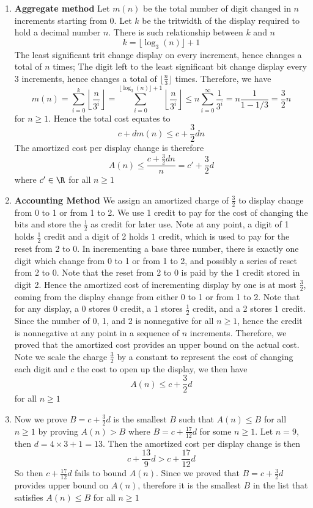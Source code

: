 \documentclass[11pt]{article}
\begin{document}
\begin{enumerate}
  \item \textbf{Aggregate method} Let $m(n)$ be the total number of digit changed in $n$ increments starting from 0. Let $k$ be the tritwidth of the display required to hold a decimal number $n$. There is such relationship between $k$ and $n$
  \[
    k = \lfloor \log_3(n) \rfloor + 1
  \]
  The least significant trit change display on every increment, hence changes a total of $n$ times; The digit left to the least significant bit change display every $3$ increments, hence changes a total of $\lfloor \frac{n}{3} \rfloor$ times. Therefore, we have
  \[
    m(n) = \sum_{i=0}^{k}\left\lfloor \frac{n}{3^i} \right\rfloor = \sum_{i=0}^{\lfloor \log_3(n) \rfloor + 1} \left\lfloor \frac{n}{3^i} \right\rfloor \leq n\sum_{i=0}^{\infty} \frac{1}{3^i} = n \frac{1}{1 - 1/3} = \frac{3}{2} n
  \]
  for $n\geq 1$. Hence the total cost equates to
  \[
    c + dm(n) \leq c + \frac{3}{2}dn
  \]
  The amortized cost per display change is therefore
  \[
    A(n) \leq \frac{c + \frac{3}{2}dn}{n} = c' + \frac{3}{2}d
  \]
  where $c' \in \R$ for all $n\geq 1$
  \item \textbf{Accounting Method} We assign an amortized charge of $\frac{3}{2}$ to display change from 0 to 1 or from 1 to 2. We use 1 credit to pay for the cost of changing the bits and store the $\frac{1}{2}$ as credit for later use. Note at any point, a digit of 1 holds $\frac{1}{2}$ credit and a digit of 2 holds $1$ credit, which is used to pay for the reset from 2 to 0. In incrementing a base three number, there is exactly one digit which change from 0 to 1 or from 1 to 2, and possibly a series of reset from 2 to 0. Note that the reset from 2 to 0 is paid by the 1 credit stored in digit 2. Hence the amortized cost of incrementing display by one is at most $\frac{3}{2}$, coming from the display change from either 0 to 1 or from 1 to 2. Note that for any display, a 0 stores 0 credit, a 1 stores $\frac{1}{2}$ credit, and a 2 stores 1 credit. Since the number of 0, 1, and 2 is nonnegative for all $n\geq 1$, hence the credit is nonnegative at any point in a sequence of $n$ increments. Therefore, we proved that the amortized cost provides an upper bound on the actual cost. Note we scale the charge $\frac{3}{2}$ by a constant to represent the cost of changing each digit and $c$ the cost to open up the display, we then have
  \[
    A(n) \leq c + \frac{3}{2}d
  \]
  for all $n\geq 1$
  \item Now we prove $B = c + \frac{3}{2}d$ is the smallest $B$ such that $A(n) \leq B$ for all $n\geq 1$ by proving $A(n) > B$ where $B = c + \frac{17}{12}d$ for some $n \geq 1$. Let $n = 9$, then $d = 4\times 3 + 1 = 13$. Then the amortized cost per display change is then
  \[
    c + \frac{13}{9}d > c + \frac{17}{12}d
  \]
  So then $c + \frac{17}{12}d$ fails to bound $A(n)$. Since we proved that $B =  c + \frac{3}{2}d$ provides upper bound on $A(n)$, therefore it is the smallest $B$ in the list that satisfies $A(n)\leq B$ for all $n\geq 1$
\end{enumerate}
\end{document}
